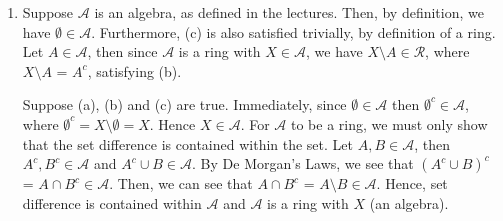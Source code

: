 \documentclass{article}
\begin{document}
\begin{flushleft}
\begin{enumerate}[label=(\roman*)]
    \item Suppose $\mathcal{A}$ is an algebra, as defined in the lectures. Then, by definition, we have $\emptyset \in \mathcal{A}$. Furthermore, (c) is also satisfied trivially, by definition of a ring. 
    Let $A \in \mathcal{A}$, then since $\mathcal{A}$ is a ring with $X \in \mathcal{A}$, we have $X \setminus A \in \mathcal{R}$, where $X \setminus A$ = $A^c$, satisfying (b). \newline

    Suppose (a), (b) and (c) are true. Immediately, since $\emptyset \in \mathcal{A}$ then $\emptyset^c \in \mathcal{A}$, where $\emptyset^c = X \setminus \emptyset = X$. Hence $X \in \mathcal{A}$. 
    For $\mathcal{A}$ to be a ring, we must only show that the set difference is contained within the set. Let $A, B \in \mathcal{A}$, then $A^c, B^c \in \mathcal{A}$ and $A^c \cup B \in \mathcal{A}$. By De Morgan's Laws, we see that $(A^c \cup B)^c$ = $A \cap B^c \in \mathcal{A}$. Then, we can see that $A \cap B^c$ = $A \setminus B \in \mathcal{A}$. Hence, set difference is contained within $\mathcal{A}$ and $\mathcal{A}$ is a ring with $X$ (an algebra).

    
\end{enumerate}
\end{flushleft}
\end{document}
